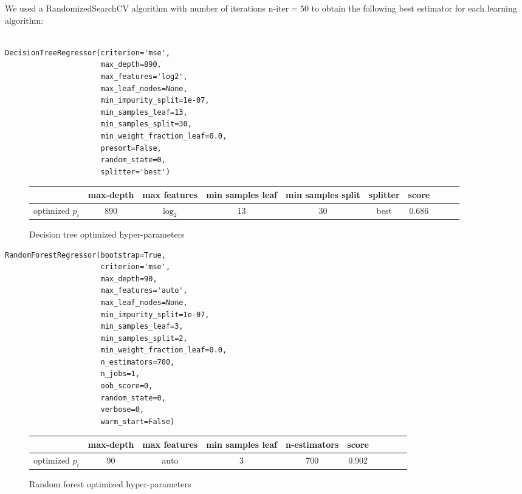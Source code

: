 We used a RandomizedSearchCV algorithm with number of iterations $\text{n-iter}=50$ to obtain the following best estimator for each learning algorithm:   
\begin{tcolorbox}
\begin{verbatim}

DecisionTreeRegressor(criterion='mse', 
                      max_depth=890,       
                      max_features='log2',
                      max_leaf_nodes=None,
                      min_impurity_split=1e-07,
                      min_samples_leaf=13, 
                      min_samples_split=30,
                      min_weight_fraction_leaf=0.0, 
                      presort=False, 
                      random_state=0,
                      splitter='best')
\end{verbatim}
\end{tcolorbox}
\begin{figure}[H]
\centering 
\begin{tabular}{l*{8}{c}r}
\hline
            & max-depth &max features&min samples leaf & min samples split  &splitter& score \\
\hline
optimized $p_i$  & 890 & $\log_2$ & 13 & 30 & best&0.686  \\
\end{tabular}
\caption{Decision tree optimized hyper-parameters }
\end{figure}
\begin{tcolorbox}
\begin{verbatim}
RandomForestRegressor(bootstrap=True,
                      criterion='mse',
                      max_depth=90,
                      max_features='auto',
                      max_leaf_nodes=None,
                      min_impurity_split=1e-07,
                      min_samples_leaf=3,
                      min_samples_split=2,
                      min_weight_fraction_leaf=0.0,
                      n_estimators=700,
                      n_jobs=1, 
                      oob_score=0,
                      random_state=0,
                      verbose=0,
                      warm_start=False)
\end{verbatim}
\end{tcolorbox}
\begin{figure}[H]
\centering 
\begin{tabular}{l*{8}{c}r}
\hline
            & max-depth &max features&min samples leaf &n-estimators & score \\
\hline
optimized $p_i$  & 90 & auto & 3 & 700 & 0.902 \\
\end{tabular}
\caption{Random forest optimized hyper-parameters }
\end{figure}
